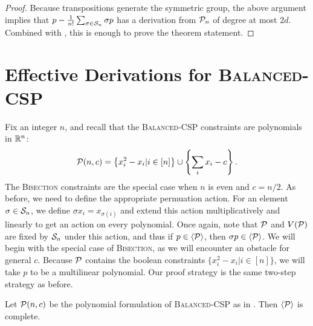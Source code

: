 \begin{proof}
Because transpositions generate the symmetric group, the above argument implies that $p - \frac{1}{n!}\sum_{\sigma \in \mathcal S_n} \sigma p$ has a derivation from $\mathcal P_n$ of degree at most $2d$. Combined with , this is enough to prove the theorem statement. 
\end{proof}

\section{Effective Derivations for \textsc{Balanced-CSP}}
Fix an integer $n$, and recall that the \textsc{Balanced-CSP} constraints are polynomials in $\mathbb R^n$:
\begin{align}
\mathcal P(n,c) = \left\{x_i^2 - x_i| i \in [n]\right\} \cup \left\{\sum_i x_i - c\right\}.\label{eq:bcsp-formulation}
\end{align}
The \textsc{Bisection} constraints are the special case when $n$ is even and $c = n/2$. 
As before, we need to define the appropriate permuation action. For an element $\sigma \in \mathcal S_n$, we define $\sigma x_i = x_{\sigma(i)}$ and extend this action multiplicatively and linearly to get an action on every polynomial. 
Once again, note that $\mathcal P$ and $V(\mathcal P)$ are fixed by $\mathcal S_n$ under this action, and thus if $p \in \langle \mathcal P \rangle$, then $\sigma p \in \langle \mathcal P \rangle$. 
We will begin with the special case of \textsc{Bisection}, as we will encounter an obstacle for general $c$. 
Because $\mathcal P$ contains the boolean constraints $\{x_i^2 - x_i | i \in [n]\}$, we will take $p$ to be a multilinear polynomial. 
Our proof strategy is the same two-step strategy as before. 
\begin{lemma}\label{lem:bcsp-complete}
Let $\mathcal P(n,c)$ be the polynomial formulation of \textsc{Balanced-CSP} as in . Then $\langle \mathcal P \rangle$ is complete.
\end{lemma}
